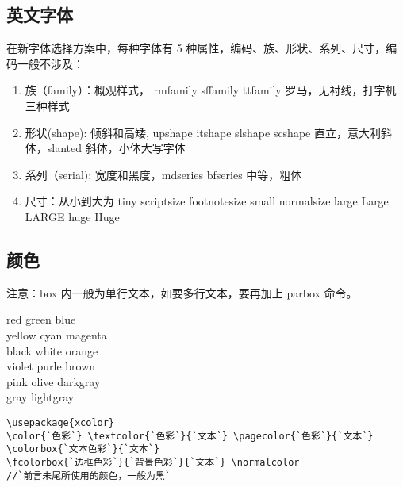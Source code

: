 \subsection{英文字体}
在新字体选择方案中，每种字体有 5 种属性，编码、族、形状、系列、尺寸，编码一般不涉及：\\
\begin{enumerate}
  \item 族（family）：概观样式， \textcolor[rgb]{0.50,0.00,1.00}{rmfamily sffamily ttfamily} 罗马，无衬线，打字机三种样式
  \item 形状(shape): 倾斜和高矮, \textcolor[rgb]{0.50,0.00,1.00}{upshape itshape slshape scshape} 直立，意大利斜体，slanted 斜体，小体大写字体
  \item 系列（serial): 宽度和黑度，\textcolor[rgb]{0.50,0.00,1.00}{mdseries bfseries} 中等，粗体
  \item 尺寸：从小到大为 \textcolor[rgb]{0.50,0.00,1.00}{tiny scriptsize footnotesize small normalsize large Large LARGE huge Huge}
\end{enumerate}


\subsection{颜色}

注意：box 内一般为单行文本，如要多行文本，要再加上 parbox 命令。\\


\begin{center}
\color{red} red \quad \color{green} green \quad\color{blue} blue\\
\color{yellow} yellow \quad  \color{cyan} cyan \quad\color{magenta} magenta\\
\color{black} black \quad \color{black} white \quad\color{orange} orange\\
\color{violet} violet \quad \color{purple} purle \quad\color{brown} brown\\
\color{pink} pink \quad \color{olive} olive \quad\color{darkgray} darkgray\\
\color{gray} gray \quad\color{lightgray} lightgray\\
\end{center}

\normalcolor
\begin{lstlisting}[language={[LaTeX]TeX}]
\usepackage{xcolor}
\color{`色彩`} \textcolor{`色彩`}{`文本`} \pagecolor{`色彩`}{`文本`}
\colorbox{`文本色彩`}{`文本`}
\fcolorbox{`边框色彩`}{`背景色彩`}{`文本`} \normalcolor
//`前言未尾所使用的颜色，一般为黑`
\end{lstlisting}

